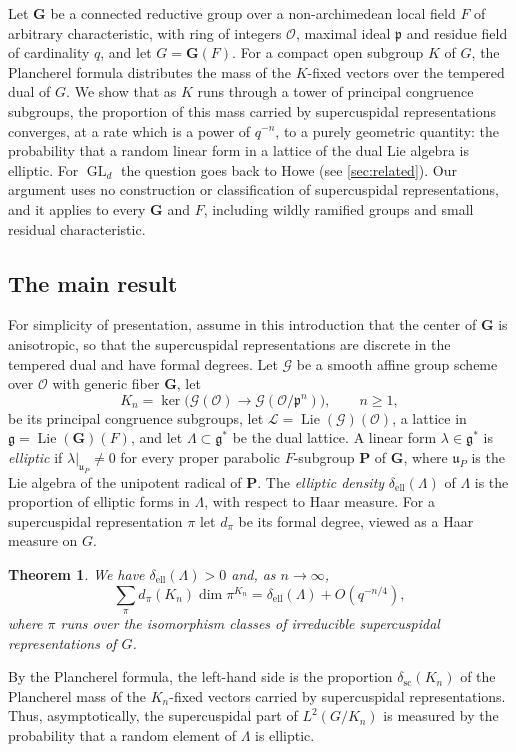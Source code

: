 \documentclass[11pt,reqno]{amsart}
\numberwithin{equation}{section}
\theoremstyle{plain}
\theoremstyle{definition}
\theoremstyle{remark}
\theoremstyle{plain}
\newtheorem{introtheorem}{Theorem}
\newcommand{\OO}{\mathcal{O}}    %
\newcommand{\pp}{\mathfrak{p}}   %
\newcommand{\Lat}{\mathcal{L}}   %
\newcommand{\dLat}{\Lambda}      %
\newcommand{\bG}{\mathbf{G}}     %
\newcommand{\bP}{\mathbf{P}}     %
\newcommand{\g}{\mathfrak{g}}    %
\newcommand{\gd}{\mathfrak{g}^*} %
\newcommand{\uu}{\mathfrak{u}}   %
\newcommand{\scd}[1]{\delta_{\mathrm{sc}}(#1)}
\newcommand{\fdeg}[1]{d_{#1}}  %
\newcommand{\elld}[2][]{\delta_{\mathrm{ell}}^{#1}(#2)}  %
\newcommand{\cG}{\mathcal{G}}                   %
\DeclareMathOperator{\Lie}{Lie}
\DeclareMathOperator{\GL}{GL}
\newcommand{\lf}{\lambda}
\begin{document}
Let $\bG$ be a connected reductive group over a non-archimedean local
field $F$ of arbitrary characteristic, with ring of integers $\OO$,
maximal ideal $\pp$ and residue field of cardinality $q$, and let
$G=\bG(F)$. For a compact open subgroup $K$ of $G$, the Plancherel
formula distributes the mass of the $K$-fixed vectors over the tempered
dual of $G$. We show that as $K$ runs through a tower of principal
congruence subgroups, the proportion of this mass carried by
supercuspidal representations converges, at a rate which is a
power of $q^{-n}$, to a purely geometric quantity: the probability that a
random linear form in a lattice of the dual Lie algebra is elliptic. For
$\GL_d$ the question goes back to Howe \cite{MR0492088} (see
\cref{sec:related}). Our argument uses no construction or classification of
supercuspidal representations, and it applies to every $\bG$ and $F$,
including wildly ramified groups and small residual characteristic.

\subsection{The main result}

For simplicity of presentation, assume in this introduction that the
center of $\bG$ is anisotropic, so that the supercuspidal representations
are discrete in the tempered dual and have formal degrees. Let $\cG$ be a
smooth affine group scheme over $\OO$ with generic fiber $\bG$, let
\[
K_n=\ker\bigl(\cG(\OO)\to\cG(\OO/\pp^n)\bigr),\qquad n\ge1,
\]
be its principal congruence subgroups, let $\Lat=\Lie(\cG)(\OO)$, a
lattice in $\g=\Lie(\bG)(F)$, and let $\dLat\subset\gd$ be the dual
lattice. A linear form $\lf\in\gd$ is \emph{elliptic} if
$\lf|_{\uu_P}\ne0$ for every proper parabolic $F$-subgroup $\bP$ of $\bG$,
where $\uu_P$ is the Lie algebra of the unipotent radical of $\bP$. The
\emph{elliptic density} $\elld{\dLat}$ of $\dLat$ is the proportion of
elliptic forms in $\dLat$, with respect to Haar measure. For a
supercuspidal representation $\pi$ let $\fdeg{\pi}$ be its formal degree,
viewed as a Haar measure on $G$.

\begin{introtheorem}\label{thm:A}
We have $\elld{\dLat}>0$ and, as $n\to\infty$,
\[
\sum_\pi\fdeg{\pi}(K_n)\dim\pi^{K_n}=\elld{\dLat}+O(q^{-n/4}),
\]
where $\pi$ runs over the isomorphism classes of irreducible supercuspidal
representations of $G$.
\end{introtheorem}

By the Plancherel formula, the left-hand side is the proportion
$\scd{K_n}$ of the Plancherel mass of the $K_n$-fixed vectors carried by
supercuspidal representations. Thus, asymptotically, the supercuspidal
part of $L^2(G/K_n)$ is measured by the probability that a random element
of $\dLat$ is elliptic.
\end{document}
